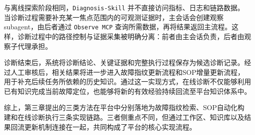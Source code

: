 与离线探索阶段相同，\texttt{Diagnosis-Skill} 并不直接访问指标、日志和链路数据。当诊断过程需要补充某一焦点范围内的可观测证据时，主会话会创建观察 subagent，由后者通过 \texttt{Observe MCP} 查询所需数据，再将结果返回主流程。这样，诊断过程中的路径控制与证据采集被明确分离：前者由主会话负责，后者由观察子代理承担。

诊断结束后，系统将诊断结论、关键证据和完整执行过程保存为候选诊断记录。经过人工审核后，相关结果将进一步进入故障指纹更新流程和SOP增量更新流程，用于补充后续任务所依赖的历史知识。通过这一实现方式，在线诊断不仅能够利用已有知识完成当前故障定位，也能够将新的有效经验持续回流至平台知识体系中。

综上，第三章提出的三类方法在平台中分别落地为故障指纹检索、SOP自动化构建和在线诊断执行三条实现链路。三者侧重点不同，但通过工作区、知识库以及结果回流更新机制连接在一起，共同构成了平台的核心实现流程。